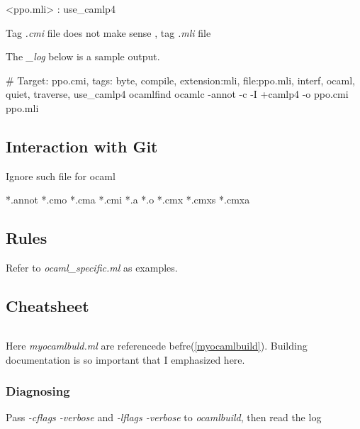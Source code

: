\begin{bashcode}
<ppo.{mli}> : use_camlp4
\end{bashcode}

Tag \textit{.cmi} file does not make sense , tag \textit{.mli} file

The \textit{\_log} below is a sample output.

\begin{bashcode}
# Target: ppo.cmi, tags: { byte, compile, extension:mli, file:ppo.mli, interf, ocaml, quiet, traverse, use_camlp4 }
ocamlfind ocamlc -annot -c -I +camlp4 -o ppo.cmi ppo.mli
\end{bashcode}


\subsection{Interaction with Git}

Ignore such file for ocaml

\begin{bashcode}
*.annot
*.cmo
*.cma
*.cmi
*.a
*.o
*.cmx
*.cmxs
*.cmxa
\end{bashcode}

\subsection{Rules}
\label{Rules}

Refer to \textit{ocaml\_specific.ml} as examples.

\subsection{Cheatsheet}

\inputminted[fontsize=\scriptsize]{bash}{code/scripts/mk_ocaml_prj}

Here \textit{myocamlbuld.ml} are referencede befre(\ref{myocamlbuild}).
Building documentation is so important that I emphasized here.

\subsubsection{Diagnosing}
\label{Diagnosing}

Pass \textit{-cflags -verbose} and \textit{-lflags -verbose} to
\textit{ocamlbuild}, then read the log
